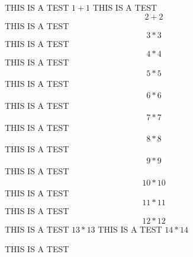 \documentclass{article}
\begin{document}
THIS IS A TEST $1+1$
THIS IS A TEST $$2+2$$
THIS IS A TEST \[3*3\]
THIS IS A TEST \begin{displaymath}4*4\end{displaymath}
THIS IS A TEST \begin{align}5*5\end{align}
THIS IS A TEST \begin{align*}6*6\end{align*}
THIS IS A TEST \begin{multline}7*7\end{multline}
THIS IS A TEST \begin{multline*}8*8\end{multline*}
THIS IS A TEST \begin{gather}9*9\end{gather}
THIS IS A TEST \begin{gather*}10*10\end{gather*}
THIS IS A TEST \begin{equation}11*11\end{equation}
THIS IS A TEST \begin{equation*}12*12\end{equation*}
THIS IS A TEST \(13*13\)
THIS IS A TEST \begin{math}14*14\end{math}

THIS IS A TEST
\end{document}
